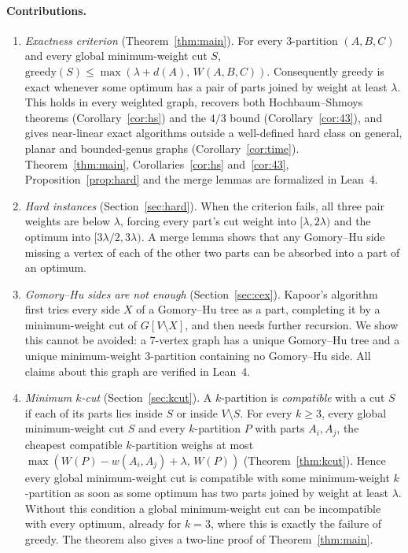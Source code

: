 \documentclass[preprint,12pt]{elsarticle}
\theoremstyle{definition}
\newcommand{\greedy}{\mathrm{greedy}}
\begin{document}
\paragraph{Contributions.}
\begin{enumerate}[leftmargin=*]
\item \emph{Exactness criterion} (Theorem~\ref{thm:main}). For every 3-partition $(A,B,C)$ and every
  global minimum-weight cut $S$, $\greedy(S)\le\max(\lambda+d(A),\,W(A,B,C))$. Consequently greedy is
  exact whenever some optimum has a pair of parts joined by weight at least $\lambda$. This holds in
  every weighted graph, recovers both Hochbaum--Shmoys theorems (Corollary~\ref{cor:hs}) and the $4/3$
  bound (Corollary~\ref{cor:43}), and gives near-linear exact algorithms outside a well-defined hard
  class on general, planar and bounded-genus graphs (Corollary~\ref{cor:time}). Theorem~\ref{thm:main},
  Corollaries~\ref{cor:hs} and~\ref{cor:43}, Proposition~\ref{prop:hard} and the merge lemmas are
  formalized in Lean~4.
\item \emph{Hard instances} (Section~\ref{sec:hard}). When the criterion fails, all three pair weights
  are below $\lambda$, forcing every part's cut weight into $[\lambda,2\lambda)$ and the optimum into
  $[3\lambda/2,3\lambda)$. A merge lemma shows that any Gomory--Hu side missing a vertex of each of the
  other two parts can be absorbed into a part of an optimum.
\item \emph{Gomory--Hu sides are not enough} (Section~\ref{sec:cex}). Kapoor's
  algorithm~\cite{Kapoor1996} first tries every side $X$ of a Gomory--Hu tree as a part, completing it by
  a minimum-weight cut of $G[V\setminus X]$, and then needs further recursion. We show this cannot be
  avoided: a 7-vertex graph has a unique Gomory--Hu tree and a unique minimum-weight 3-partition
  containing no Gomory--Hu side. All claims about this graph are verified in Lean~4.
\item \emph{Minimum $k$-cut} (Section~\ref{sec:kcut}). A $k$-partition is \emph{compatible} with a
  cut $S$ if each of its parts lies inside $S$ or inside $V\setminus S$. For every $k\ge3$, every
  global minimum-weight cut $S$ and every $k$-partition $P$ with parts $A_i,A_j$, the cheapest
  compatible $k$-partition weighs at most $\max(W(P)-w(A_i,A_j)+\lambda,\,W(P))$
  (Theorem~\ref{thm:kcut}). Hence every global minimum-weight cut is compatible with some
  minimum-weight $k$-partition as soon as some optimum has two parts joined by weight at least
  $\lambda$. Without this condition a global minimum-weight cut can be incompatible with every
  optimum, already for $k=3$, where this is exactly the failure of greedy. The theorem also gives a
  two-line proof of Theorem~\ref{thm:main}.
\end{enumerate}
\end{document}
